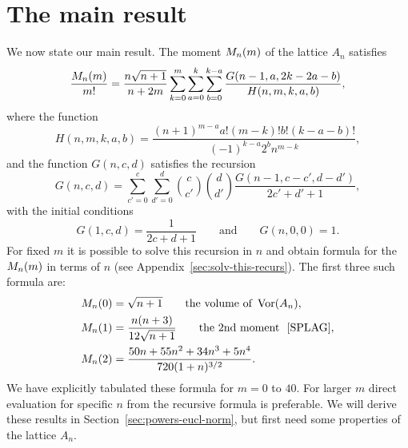 \documentclass[journal]{IEEEtran}
\begin{document}



\section{The main result}\label{sec:main-result}

We now state our main result.  The moment $M_n(m)$ of the lattice $A_n$ satisfies
\begin{equation}\label{eq:theCmformula}
\frac{\calM_n(m)}{m!} = \frac{n\sqrt{n+1}}{n+2m}\sum_{k=0}^{m}\sum_{a =0}^{k}\sum_{b=0}^{k-a} \frac{G(n-1,a,2k - 2a - b)}{H(n,m,k,a,b)},
\end{equation}
where the function
\[
H(n,m,k,a,b) = \frac{(n+1)^{m-a}a!(m-k)!b! (k-a-b)!}{(-1)^{k-a}2^{b} n^{m-k}},
\]
and the function $G(n,c,d)$ satisfies the recursion
\begin{equation}\label{eq:theGrecursion}
G(n,c,d) = \sum_{c'=0}^{c} \sum_{d'=0}^{d} \binom{c}{c'}\binom{d}{d'} \frac{G(n-1,c-c',d-d')}{2c'+d'+1},
\end{equation}
with the initial conditions
\[
G(1,c,d) = \frac{1}{2c+d+1} \qquad \text{and} \qquad G(n,0,0) = 1.
\]
For fixed $m$ it is possible to solve this recursion in $n$ and obtain formula for the $M_n(m)$ in terms of $n$ (see Appendix~\ref{sec:solv-this-recurs}).  The first three such formula are:
\begin{align*}
\calM_n(0) &= \sqrt{n+1} \qquad \text{the volume of~}\vor(A_n),\\
\calM_n(1) &= \frac{n(n+3)}{12\sqrt{n+1}} \qquad \text{the 2nd moment~ \cite[p. 462]{SPLAG}}, \\
\calM_n(2) &=  \frac{50 n + 55 n^2 + 34 n^3 + 5 n^4}{720 (1 + n)^{3/2}}.
\end{align*}
We have explicitly tabulated these formula for $m=0$ to $40$. For larger $m$ direct evaluation for specific $n$ from the recursive formula is preferable.  We will derive these results in Section~\ref{sec:powers-eucl-norm}, but first need some properties of the lattice $A_n$.
\end{document}
